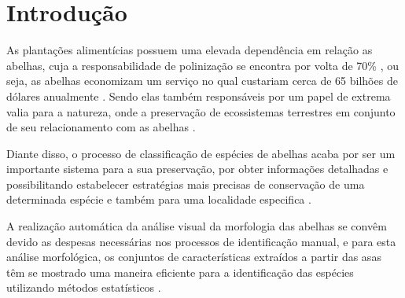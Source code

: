 \documentclass[
	12pt,				%
	oneside,			%
	a4paper,			%
	english,			%
	brazil				%
	]{abntex2ppgsi}
\begin{document}
\tableofcontents*
\cleardoublepage



\textual



% 
%
%

\chapter{Introdução}
As plantações alimentícias possuem uma elevada dependência  em relação as abelhas, cuja a responsabilidade de polinização se encontra por volta de 70\% \cite{drauschke2007reliable}, ou seja, as abelhas economizam um serviço no qual custariam cerca de 65 bilhões de dólares anualmente \cite{pimentel1997economic}. Sendo elas também responsáveis por um papel de extrema valia para a natureza, onde a preservação de ecossistemas terrestres em conjunto de seu relacionamento com as abelhas \cite{lawton1998daily}. 

Diante disso, o processo de classificação de espécies de abelhas acaba por ser um importante sistema para a sua preservação, por obter informações detalhadas e possibilitando estabelecer estratégias mais precisas de conservação de uma determinada espécie e também para uma localidade especifica \cite{goulson2015bee}. 

A realização automática da análise visual da morfologia das abelhas se convêm devido as despesas necessárias nos processos de identificação manual, e para esta análise morfológica, os conjuntos de características extraídos a partir das asas têm se mostrado uma maneira eficiente para a identificação das espécies utilizando métodos estatísticos \cite{francoy2008identification}.
\end{document}
